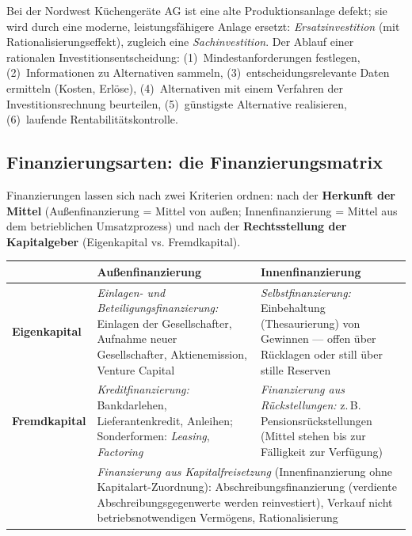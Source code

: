 \documentclass[11pt, a4paper]{article}
\begin{document}
\begin{beispiel}
Bei der Nordwest Küchengeräte AG ist eine alte Produktionsanlage defekt; sie wird durch
eine moderne, leistungsfähigere Anlage ersetzt: \emph{Ersatzinvestition} (mit
Rationalisierungseffekt), zugleich eine \emph{Sachinvestition}. Der Ablauf einer rationalen
Investitionsentscheidung: (1)~Mindestanforderungen festlegen, (2)~Informationen zu
Alternativen sammeln, (3)~entscheidungsrelevante Daten ermitteln (Kosten, Erlöse),
(4)~Alternativen mit einem Verfahren der Investitionsrechnung beurteilen, (5)~günstigste
Alternative realisieren, (6)~laufende Rentabilitätskontrolle.
\end{beispiel}

\subsection{Finanzierungsarten: die Finanzierungsmatrix}

Finanzierungen lassen sich nach zwei Kriterien ordnen: nach der \textbf{Herkunft der
Mittel} (Außenfinanzierung = Mittel von außen; Innenfinanzierung = Mittel aus dem
betrieblichen Umsatzprozess) und nach der \textbf{Rechtsstellung der Kapitalgeber}
(Eigenkapital vs. Fremdkapital).

\begin{center}
\begin{tabular}{p{2.8cm} p{5.6cm} p{5.6cm}}
 & \textbf{Außenfinanzierung} & \textbf{Innenfinanzierung}\\
\hline
\textbf{Eigenkapital} & \emph{Einlagen- und Beteiligungsfinanzierung:} Einlagen der
Gesellschafter, Aufnahme neuer Gesellschafter, Aktienemission, Venture Capital &
\emph{Selbstfinanzierung:} Einbehaltung (Thesaurierung) von Gewinnen --- offen über
Rücklagen oder still über stille Reserven\\
\hline
\textbf{Fremdkapital} & \emph{Kreditfinanzierung:} Bankdarlehen, Lieferantenkredit,
Anleihen; Sonderformen: \emph{Leasing}, \emph{Factoring} & \emph{Finanzierung aus
Rückstellungen:} z.\,B. Pensionsrückstellungen (Mittel stehen bis zur Fälligkeit zur
Verfügung)\\
\hline
\multicolumn{1}{l}{} & \multicolumn{2}{p{11.2cm}}{\emph{Finanzierung aus
Kapitalfreisetzung} (Innenfinanzierung ohne Kapitalart-Zuordnung): Abschreibungsfinanzierung
(verdiente Abschreibungsgegenwerte werden reinvestiert), Verkauf nicht betriebsnotwendigen
Vermögens, Rationalisierung}\\
\end{tabular}
\end{center}
\end{document}
